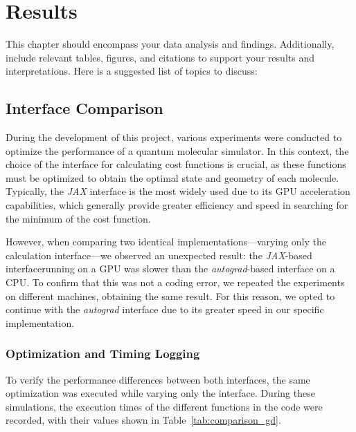 \chapter{Results}
This chapter should encompass your data analysis and findings. Additionally, include relevant tables, figures, and citations to support your results and interpretations. Here is a suggested list of topics to discuss:
\section{Interface Comparison}
During the development of this project, various experiments were conducted to optimize the performance of a quantum molecular simulator. In this context, the choice of the interface for calculating cost functions is crucial, as these functions must be optimized to obtain the optimal state and geometry of each molecule. Typically, the \textit{JAX} interface is the most widely used due to its GPU acceleration capabilities, which generally provide greater efficiency and speed in searching for the minimum of the cost function.

However, when comparing two identical implementations—varying only the calculation interface—we observed an unexpected result: the \textit{JAX}-based interfacerunning on a GPU was slower than the \textit{autograd}-based interface on a CPU. To confirm that this was not a coding error, we repeated the experiments on different machines, obtaining the same result. For this reason, we opted to continue with the \textit{autograd} interface due to its greater speed in our specific implementation.

\subsection{Optimization and Timing Logging}
To verify the performance differences between both interfaces, the same optimization was executed while varying only the interface. During these simulations, the execution times of the different functions in the code were recorded, with their values shown in Table~\ref{tab:comparison_gd}.


